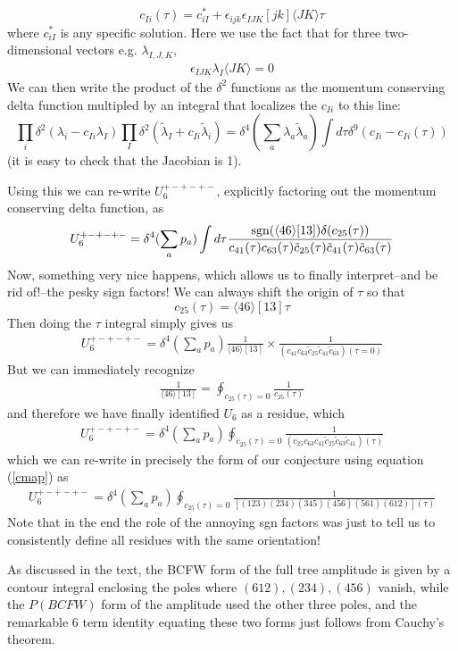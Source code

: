\documentclass[12pt]{article}
\newcommand{\be}{\begin{eqnarray}}
\newcommand{\ee}{\end{eqnarray}}
\begin{document}
\begin{equation}
c_{Ii}(\tau) = c^*_{iI} + \epsilon_{ijk} \epsilon_{IJK} [jk] \langle J K \rangle \tau
\end{equation}
where $c^*_{iI}$ is any specific solution.
Here we use the fact that for three two-dimensional vectors e.g. $\lambda_{I,J,K}$,
\be
\epsilon_{IJK} \lambda_I \langle J K \rangle = 0
\ee
We can then write the product of the $\delta^2$ functions as the momentum conserving delta function multipled by an integral that localizes the $c_{Ii}$ to this
line:
\begin{equation}
\prod_i \delta^2(\lambda_i - c_{Ii}\lambda_I) \prod_I \delta^2(\tilde \lambda_I + c_{Ii} \tilde \lambda_i) = \delta^4(\sum_a \lambda_a \tilde \lambda_a) \int d \tau \delta^9 \left(c_{Ii} - c_{Ii}(\tau) \right)
\end{equation}
(it is easy to check that the Jacobian is 1).

Using this we can re-write $U^{+-+-+-}_6$, explicitly factoring out the momentum conserving delta function, as
\be
U^{+-+-+-}_6 = \delta^4(\sum_a p_a) \int d \tau  \frac{{\rm sgn}(\langle 4 6 \rangle [13]) \delta(c_{25}(\tau))}{c_{41}(\tau) c_{63}(\tau) \tilde
c_{25}(\tau) \tilde c_{41}(\tau) \tilde c_{63}(\tau)}
\ee
Now, something very nice happens, which allows us to finally interpret--and be rid of!--the pesky sign factors! We can always shift the origin of $\tau$ so that
\begin{equation}
c_{25}(\tau) = \langle 4 6 \rangle [13] \tau
\end{equation}
Then doing the $\tau$ integral simply gives us
\be
U^{+-+-+-}_6  = \delta^4(\sum_a p_a) \frac{1}{\langle 4 6 \rangle [13]} \times \frac{1}{(c_{41} c_{63} \tilde c_{25} \tilde c_{41} \tilde c_{63})(\tau = 0)}
\ee
But we can immediately recognize
\be
\frac{1}{\langle 4 6 \rangle [13]} = \oint_{c_{25}(\tau) = 0} \frac{1}{c_{25}(\tau)}
\ee
and therefore we have finally identified $U_6$ as a residue, which
\be
U_6^{+-+-+-} = \delta^4(\sum_a p_a) \oint_{c_{25}(\tau) = 0} \frac{1}{(c_{25} c_{63} c_{41} \tilde c_{25} \tilde c_{63} \tilde c_{41})(\tau)}
\ee
which we can re-write in precisely the form of our conjecture using equation (\ref{cmap}) as
\be
U_6^{+-+-+-} = \delta^4(\sum_a p_a) \oint_{c_{25}(\tau) = 0} \frac{1}{[(123)(234)(345)(456)(561)(612)](\tau)}
\ee
Note that in the end the role of the annoying sgn factors was just to tell us to consistently define all residues with the same orientation!


As discussed in the text, the BCFW form of the full tree amplitude is given by a contour integral enclosing the poles where $(612),(234),(456)$ vanish, while the $P(BCFW)$ form of the amplitude used the other three poles, and the remarkable 6 term identity equating these two forms just follows from Cauchy's theorem.
\end{document}
